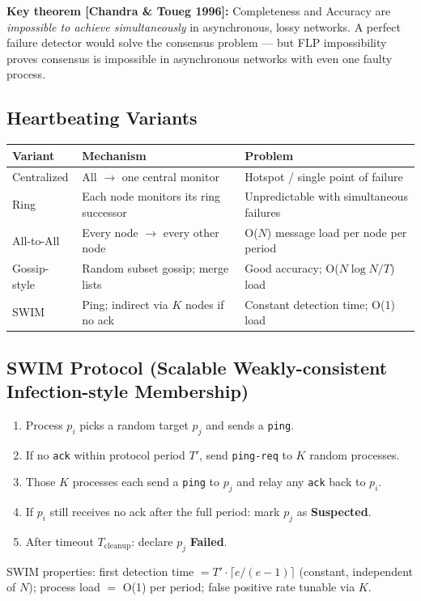 \documentclass[12pt,a4paper]{article}
\begin{document}
\begin{notesbox}
\textbf{Key theorem [Chandra \& Toueg 1996]:} Completeness and Accuracy are
\emph{impossible to achieve simultaneously} in asynchronous, lossy networks.
A perfect failure detector would solve the consensus problem —
but FLP impossibility proves consensus is impossible in asynchronous networks
with even one faulty process.
\end{notesbox}

\subsection{Heartbeating Variants}
\begin{center}
\renewcommand{\arraystretch}{1.25}
\begin{tabular}{lll}
\toprule
\textbf{Variant} & \textbf{Mechanism} & \textbf{Problem} \\
\midrule
Centralized & All $\to$ one central monitor & Hotspot / single point of failure \\
Ring & Each node monitors its ring successor & Unpredictable with simultaneous failures \\
All-to-All & Every node $\to$ every other node & O($N$) message load per node per period \\
Gossip-style & Random subset gossip; merge lists & Good accuracy; O($N\log N/T$) load \\
SWIM & Ping; indirect via $K$ nodes if no ack & Constant detection time; O(1) load \\
\bottomrule
\end{tabular}
\end{center}

\subsection{SWIM Protocol (Scalable Weakly-consistent Infection-style Membership)}
\begin{enumerate}
  \item Process $p_i$ picks a random target $p_j$ and sends a \texttt{ping}.
  \item If no \texttt{ack} within protocol period $T'$, send \texttt{ping-req} to $K$ random processes.
  \item Those $K$ processes each send a \texttt{ping} to $p_j$ and relay any \texttt{ack} back to $p_i$.
  \item If $p_i$ still receives no ack after the full period: mark $p_j$ as \textbf{Suspected}.
  \item After timeout $T_{\text{cleanup}}$: declare $p_j$ \textbf{Failed}.
\end{enumerate}
SWIM properties: first detection time $= T' \cdot \lceil e/(e-1) \rceil$ (constant, independent of $N$);
process load $=$ O(1) per period; false positive rate tunable via $K$.
\end{document}
